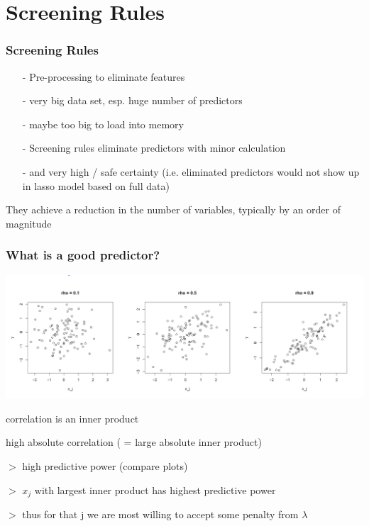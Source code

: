 \documentclass{beamer}
\begin{document}


\section{Screening Rules}

\begin{frame}
\frametitle{Screening Rules}

\begin{itemize}
	\item[-] Pre-processing to eliminate features
	\item[-] very big data set, esp. huge number of predictors
	\item[-] maybe too big to load into memory
	\item[-] Screening rules eliminate predictors with minor calculation
	\item[-] and very high / safe certainty (i.e. eliminated predictors would not show up in lasso model based on full data)
\end{itemize}


They achieve a reduction in the number of variables, typically by an order of magnitude




\end{frame}

\begin{frame}
\frametitle{What is a good predictor?}

\includegraphics[width=\linewidth]{img/differentCorrelationPlots}

correlation is an inner product

high absolute correlation ( = large absolute inner product) 

$>$ high predictive power (compare plots) 

$>$ $x_j$ with largest inner product has highest predictive power 

$>$ thus for that j we are most willing to accept some penalty from $\lambda$

\end{frame}
\end{document}
